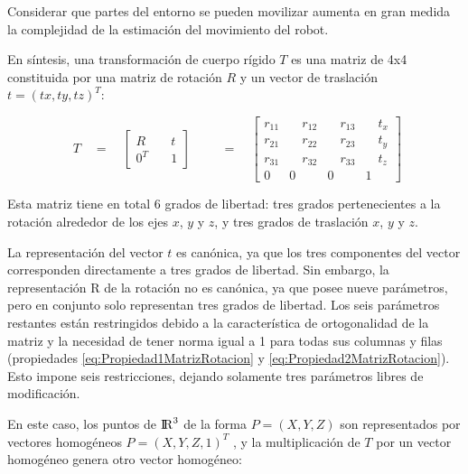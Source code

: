 Considerar que partes del entorno se pueden movilizar aumenta en gran medida la complejidad de la estimación del movimiento del robot.

En síntesis, una transformación de cuerpo rígido $T$  es una matriz de 4x4 constituida por una matriz de rotación $R$ y un vector de traslación $t = {(tx, ty, tz)}^{T}$:

\begin{equation}
\begin{matrix} { { T } }\quad =\quad \begin{bmatrix} R & \quad { { t } } \\ { 0 }^{ T } & \quad 1 \end{bmatrix}\quad  \end{matrix}\quad =\quad \begin{bmatrix} { r }_{ 11 } & { \quad r }_{ 12 } & { \quad r }_{ 13 } & \quad t_{ x } \\ { r }_{ 21 } & { \quad r }_{ 22 } & { \quad r }_{ 23 } & { \quad t }_{ y } \\ { r }_{ 31 } & { \quad r }_{ 32 } & { \quad r }_{ 33 } & \quad { t }_{ z } \\ 0 & 0 & 0 & 1 \end{bmatrix}
\label{eq:TC}
\end{equation}

Esta matriz tiene en total 6 grados de libertad: tres grados pertenecientes a la rotación alrededor de los ejes $x$, $y$ y $z$, y tres grados de traslación $x$, $y$ y $z$. 

La representación del vector $t$ es canónica, ya que los tres componentes del vector corresponden directamente
a tres grados de libertad. Sin embargo, la representación R de la rotación no es
canónica, ya que posee nueve parámetros, pero en conjunto solo representan
tres grados de libertad. Los seis parámetros restantes están restringidos debido
a la característica de ortogonalidad de la matriz y la necesidad de tener norma
igual a 1 para todas sus columnas y filas (propiedades \ref{eq:Propiedad1MatrizRotacion} y \ref{eq:Propiedad2MatrizRotacion}). Esto impone seis restricciones, dejando
solamente tres parámetros libres de modificación.

En este caso, los puntos de ${\rm I\!R}^3$ de la forma $P = (X, Y, Z)$  son representados por vectores homogéneos $P = {(X, Y, Z, 1)}^{T}$ , y la multiplicación de $T$ por un vector homogéneo genera otro vector homogéneo:

